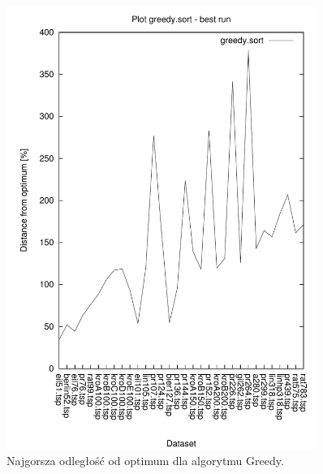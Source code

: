 \begin{figure}
\begin{center}
\includegraphics[width=0.9\textwidth]{wykresy/greedy_sort_worst}
\end{center}
\caption{Najgorsza odległość od optimum dla algorytmu Greedy.}
\label{greedy_sort_worst}
\end{figure}


